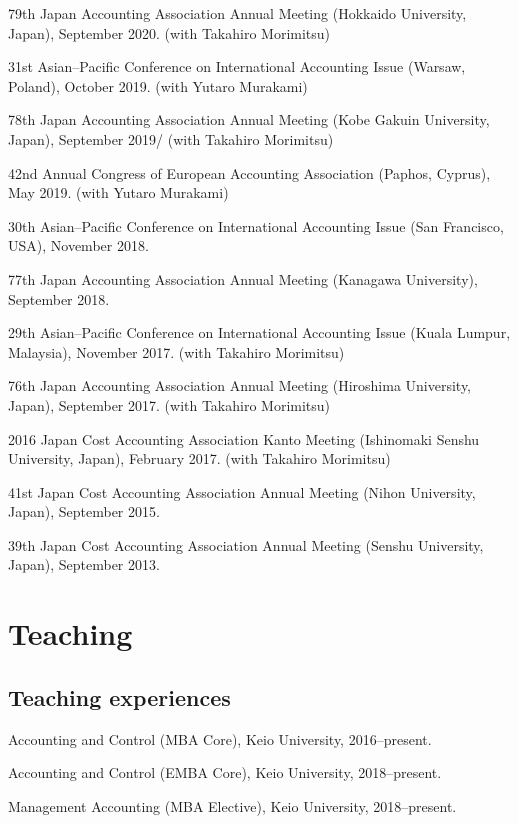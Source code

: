 \documentclass[letterpaper,uplatex]{article}
\renewenvironment{itemize}{
  \begin{list}{}{
    \setlength{\leftmargin}{1.5em}
  }
}{
  \end{list}
}
\begin{document}
\begin{itemize}
  \item 79th Japan Accounting Association Annual Meeting (Hokkaido University, Japan), September 2020. (with Takahiro Morimitsu)
  \item 31st Asian--Pacific Conference on International Accounting Issue (Warsaw, Poland), October 2019. (with Yutaro Murakami)
  \item 78th Japan Accounting Association Annual Meeting (Kobe Gakuin University, Japan), September 2019/ (with Takahiro Morimitsu)
  \item 42nd Annual Congress of European Accounting Association (Paphos, Cyprus), May 2019. (with Yutaro Murakami)
  \item 30th Asian--Pacific Conference on International Accounting Issue (San Francisco, USA), November 2018.
  \item 77th Japan Accounting Association Annual Meeting (Kanagawa University), September 2018.
  \item 29th Asian--Pacific Conference on International Accounting Issue (Kuala Lumpur, Malaysia), November 2017. (with Takahiro Morimitsu)
  \item 76th Japan Accounting Association Annual Meeting (Hiroshima University, Japan), September 2017. (with Takahiro Morimitsu)
  \item 2016 Japan Cost Accounting Association Kanto Meeting (Ishinomaki Senshu University, Japan), February 2017. (with Takahiro Morimitsu)
  \item 41st Japan Cost Accounting Association Annual Meeting (Nihon University, Japan), September 2015.
  \item 39th Japan Cost Accounting Association Annual Meeting (Senshu University, Japan), September 2013.
\end{itemize}

\section*{Teaching}

\subsection*{Teaching experiences}

\begin{itemize}
	\item Accounting and Control (MBA Core), Keio University, 2016--present.
	\item Accounting and Control (EMBA Core), Keio University, 2018--present.
	\item Management Accounting (MBA Elective), Keio University, 2018--present.
\end{itemize}
\end{document}
